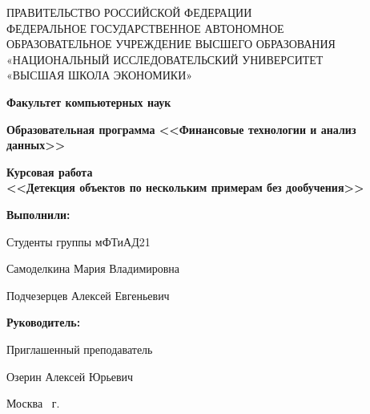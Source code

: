 \begin{titlepage}
    \begin{center}
        ПРАВИТЕЛЬСТВО РОССИЙСКОЙ ФЕДЕРАЦИИ \\
        ФЕДЕРАЛЬНОЕ ГОСУДАРСТВЕННОЕ АВТОНОМНОЕ \\
        ОБРАЗОВАТЕЛЬНОЕ УЧРЕЖДЕНИЕ ВЫСШЕГО ОБРАЗОВАНИЯ\\
        «НАЦИОНАЛЬНЫЙ ИССЛЕДОВАТЕЛЬСКИЙ УНИВЕРСИТЕТ\\
        «ВЫСШАЯ ШКОЛА ЭКОНОМИКИ»
    \end{center}

    \begin{center}
        \textbf{Факультет компьютерных наук}

        \textbf{Образовательная программа <<Финансовые технологии и анализ данных>>}


    \end{center}
    \vspace{1ex}

    \begin{center}
        \textbf{Курсовая работа \\
            <<Детекция объектов по нескольким примерам без дообучения>>
        }
    \end{center}

    \vspace{2ex}
    \vfill

    \vspace{2ex}

    \begin{flushright}
        \textbf{Выполнили:}

        \vspace{2ex}

        Студенты группы мФТиАД21

        \vspace{2ex}

        Самоделкина Мария Владимировна

        Подчезерцев Алексей Евгеньевич

		\vspace{2ex}
		\textbf{Руководитель:}
		
		Приглашенный преподаватель
		
		Озерин Алексей Юрьевич
		
    \end{flushright}

    \vspace{5ex}
    \begin{center}
        Москва \the\year \, г.
    \end{center}

\end{titlepage}
\addtocounter{page}{1}